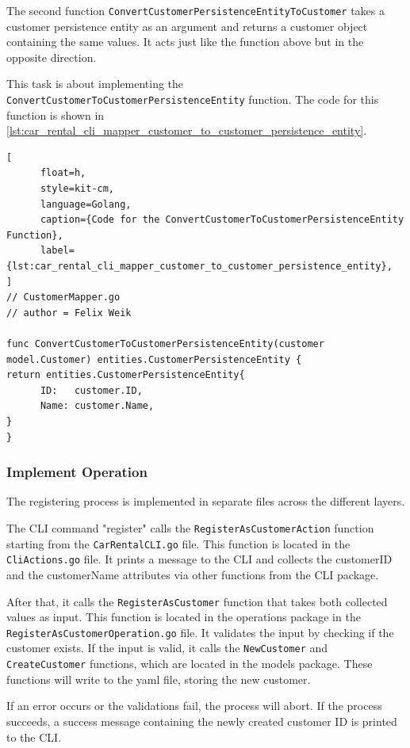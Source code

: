The second function \texttt{ConvertCustomerPersistenceEntityToCustomer} takes a customer persistence entity as an argument and returns a customer object containing the same values.
It acts just like the function above but in the opposite direction.

This task is about implementing the \texttt{ConvertCustomerToCustomerPersistenceEntity} function.
The code for this function is shown in \autoref{lst:car_rental_cli_mapper_customer_to_customer_persistence_entity}.

\begin{lstlisting}[
      float=h,
      style=kit-cm,
      language=Golang,
      caption={Code for the ConvertCustomerToCustomerPersistenceEntity Function},
      label={lst:car_rental_cli_mapper_customer_to_customer_persistence_entity},
]
// CustomerMapper.go
// author = Felix Weik

func ConvertCustomerToCustomerPersistenceEntity(customer model.Customer) entities.CustomerPersistenceEntity {
return entities.CustomerPersistenceEntity{
      ID:   customer.ID,
      Name: customer.Name,
}
}
\end{lstlisting}

\subsubsection*{Implement Operation}
The registering process is implemented in separate files across the different layers.

The CLI command "register" calls the \texttt{RegisterAsCustomerAction} function starting from the \texttt{CarRentalCLI.go} file.
This function is located in the \texttt{CliActions.go} file.
It prints a message to the CLI and collects the customerID and the customerName attributes via other functions from the CLI package.

After that, it calls the \texttt{RegisterAsCustomer} function that takes both collected \hfill \linebreak values as input.
This function is located in the operations package in the \hfill \linebreak \texttt{RegisterAsCustomerOperation.go} file.
It validates the input by checking if the customer exists.
If the input is valid, it calls the \texttt{NewCustomer} and \texttt{CreateCustomer} functions, which are located in the models package.
These functions will write to the yaml file, storing the new customer.

If an error occurs or the validations fail, the process will abort.
If the process succeeds, a success message containing the newly created customer ID is printed to the CLI.

